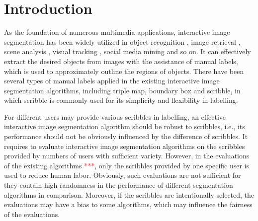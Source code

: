 \documentclass[runningheads,a4paper]{llncs}
\begin{document}
\section{Introduction}
As the foundation of numerous multimedia applications, interactive image segmentation has been widely utilized in object recognition \cite{Bao13tip}, image retrieval \cite{Xu14icme}, scene analysis \cite{Li15tcsvt}, visual tracking \cite{Ren15mmsys}, social media mining \cite{Sang12tmm} and so on. It can effectively extract the desired objects from images with the assistance of manual labels, which is used to approximately outline the regions of objects. There have been several types of manual labels applied in the existing interactive image segmentation algorithms, including triple map, boundary box and scribble, in which scribble is commonly used for its simplicity and flexibility in labelling.

For different users may provide various scribbles in labelling, an effective interactive image segmentation algorithm should be robust to scribbles, i.e., its performance should not be obviously influenced by the difference of scribbles. It requires to evaluate interactive image segmentation algorithms on the scribbles provided by numbers of users with sufficient variety. However, in the evaluations of the existing algorithms \textcolor{red}{***}, only the scribbles provided by one specific user is used to reduce human labor. Obviously, such evaluations are not sufficient for they contain high randomness in the performance of different segmentation algorithms in comparison. Moreover, if the scribbles are intentionally selected, the evaluations may have a bias to some algorithms, which may influence the fairness of the evaluations.
\end{document}
